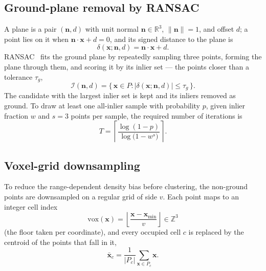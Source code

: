 \subsection{Ground-plane removal by RANSAC}
\label{sec:th-ransac}
A plane is a pair $(\mathbf{n}, d)$ with unit normal $\mathbf{n}\in\mathbb{R}^3$,
$\lVert\mathbf{n}\rVert = 1$, and offset $d$; a point lies on it when
$\mathbf{n}\cdot\mathbf{x} + d = 0$, and its signed distance to the plane is
\begin{equation}
  \delta(\mathbf{x};\mathbf{n},d) = \mathbf{n}\cdot\mathbf{x} + d .
\end{equation}
RANSAC~\cite{fischler1981random} fits the ground plane by repeatedly sampling three points,
forming the plane through them, and scoring it by its inlier set --- the points closer than
a tolerance $\tau_g$,
\begin{equation}
  \mathcal{I}(\mathbf{n},d) = \bigl\{\, \mathbf{x}\in P : \lvert \delta(\mathbf{x};\mathbf{n},d)\rvert \le \tau_g \,\bigr\}.
\end{equation}
The candidate with the largest inlier set is kept and its inliers removed as ground. To draw
at least one all-inlier sample with probability $p$, given inlier fraction $w$ and $s=3$
points per sample, the required number of iterations is
\begin{equation}
  T = \left\lceil \frac{\log(1-p)}{\log\!\bigl(1 - w^{s}\bigr)} \right\rceil .
\end{equation}

\subsection{Voxel-grid downsampling}
\label{sec:th-voxel}
To reduce the range-dependent density bias before clustering, the non-ground points are
downsampled on a regular grid of side $v$. Each point maps to an integer cell index
\begin{equation}
  \mathrm{vox}(\mathbf{x}) = \left\lfloor \frac{\mathbf{x} - \mathbf{x}_{\min}}{v} \right\rfloor \in \mathbb{Z}^3
\end{equation}
(the floor taken per coordinate), and every occupied cell $c$ is replaced by the centroid of
the points that fall in it,
\begin{equation}
  \bar{\mathbf{x}}_c = \frac{1}{\lvert P_c\rvert} \sum_{\mathbf{x}\in P_c} \mathbf{x} .
\end{equation}

